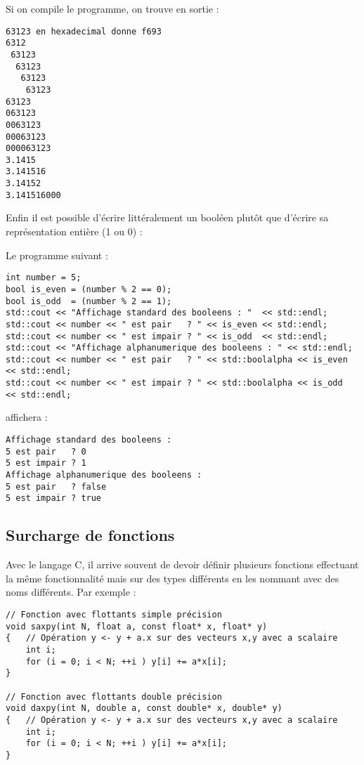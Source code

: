Si on compile le programme, on trouve en sortie :
\begin{Verbatim}[frame=single]
63123 en hexadecimal donne f693
6312
 63123
  63123
   63123
    63123
63123
063123
0063123
00063123
000063123
3.1415
3.141516
3.14152
3.141516000
\end{Verbatim}

Enfin il est possible d'écrire littéralement un booléen plutôt que d'écrire sa représentation entière (1 ou 0) :

Le programme suivant :
\begin{lstlisting}
int number = 5;
bool is_even = (number % 2 == 0);
bool is_odd  = (number % 2 == 1);
std::cout << "Affichage standard des booleens : "  << std::endl;
std::cout << number << " est pair   ? " << is_even << std::endl;
std::cout << number << " est impair ? " << is_odd  << std::endl;
std::cout << "Affichage alphanumerique des booleens : " << std::endl;
std::cout << number << " est pair   ? " << std::boolalpha << is_even << std::endl;
std::cout << number << " est impair ? " << std::boolalpha << is_odd  << std::endl;
\end{lstlisting}

affichera :

\begin{verbatim}
Affichage standard des booleens : 
5 est pair   ? 0
5 est impair ? 1
Affichage alphanumerique des booleens : 
5 est pair   ? false
5 est impair ? true
\end{verbatim}

\subsection{Surcharge de fonctions}

Avec le langage C, il arrive souvent de devoir définir plusieurs fonctions effectuant la même fonctionnalité mais sur des types différents en les nommant avec des noms différents. Par exemple :

\begin{lstlisting}[caption=Exemple de deux fonctions C effectuant la même opération sur des types différents]
// Fonction avec flottants simple précision
void saxpy(int N, float a, const float* x, float* y)
{   // Opération y <- y + a.x sur des vecteurs x,y avec a scalaire
    int i;
    for (i = 0; i < N; ++i ) y[i] += a*x[i];
}

// Fonction avec flottants double précision
void daxpy(int N, double a, const double* x, double* y)
{   // Opération y <- y + a.x sur des vecteurs x,y avec a scalaire
    int i;
    for (i = 0; i < N; ++i ) y[i] += a*x[i];
}
\end{lstlisting}

